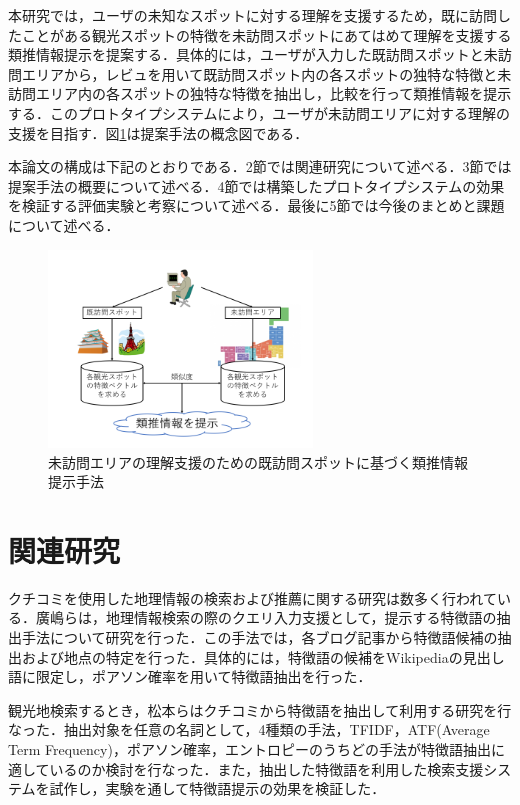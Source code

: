 \documentclass{deimj}
\begin{document}
本研究では，ユーザの未知なスポットに対する理解を支援するため，既に訪問したことがある観光スポットの特徴を未訪問スポットにあてはめて理解を支援する類推情報提示を提案する．具体的には，ユーザが入力した既訪問スポットと未訪問エリアから，レビュを用いて既訪問スポット内の各スポットの独特な特徴と未訪問エリア内の各スポットの独特な特徴を抽出し，比較を行って類推情報を提示する．このプロトタイプシステムにより，ユーザが未訪問エリアに対する理解の支援を目指す．図\ref{fig:photo_image}は提案手法の概念図である．

本論文の構成は下記のとおりである．2節では関連研究について述べる．3節では提案手法の概要について述べる．4節では構築したプロトタイプシステムの効果を検証する評価実験と考察について述べる．最後に5節では今後のまとめと課題について述べる．

\begin{figure}[t]
  \begin{center}
    \includegraphics[clip,width=7.0cm]{picture/Photo_Image.png}
    \caption{未訪問エリアの理解支援のための既訪問スポットに基づく類推情報提示手法}
    \label{fig:photo_image}
   \end{center}
\end{figure}


\section{関連研究}
\label{sec:Related Research Papers}
クチコミを使用した地理情報の検索および推薦に関する研究は数多く行われている．廣嶋ら\cite{Codd01}は，地理情報検索の際のクエリ入力支援として，提示する特徴語の抽出手法について研究を行った．この手法では，各ブログ記事から特徴語候補の抽出および地点の特定を行った．具体的には，特徴語の候補をWikipediaの見出し語に限定し，ポアソン確率を用いて特徴語抽出を行った．

観光地検索するとき，松本ら\cite{Codd02}はクチコミから特徴語を抽出して利用する研究を行なった．抽出対象を任意の名詞として，4種類の手法，TFIDF，ATF(Average Term Frequency)，ポアソン確率，エントロピーのうちどの手法が特徴語抽出に適しているのか検討を行なった．また，抽出した特徴語を利用した検索支援システムを試作し，実験を通して特徴語提示の効果を検証した．
\end{document}
